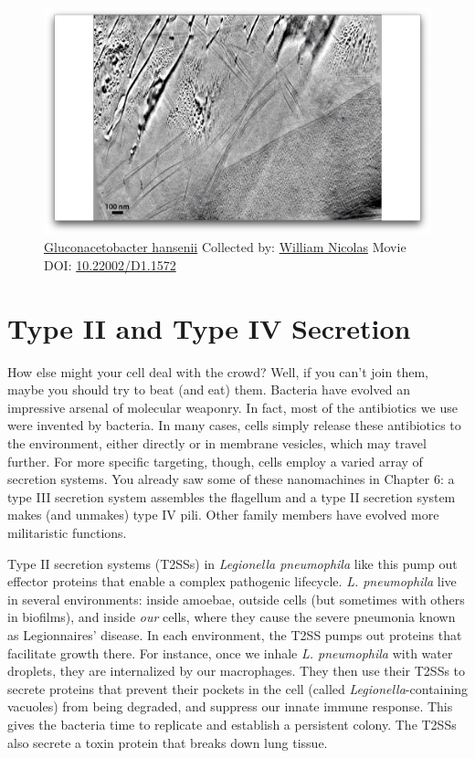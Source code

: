 \documentclass[]{tufte-book}
\begin{document}
\begin{figure}
\includegraphics{movie_stills/9_2} \caption[\protect\hyperlink{tree}{Gluconacetobacter hansenii} Collected
by: \protect\hyperlink{william_nicolas}{William Nicolas} Movie DOI:
\href{https://doi.org/10.22002/D1.1572}{10.22002/D1.1572}]{\protect\hyperlink{tree}{Gluconacetobacter hansenii} Collected
by: \protect\hyperlink{william_nicolas}{William Nicolas} Movie DOI:
\href{https://doi.org/10.22002/D1.1572}{10.22002/D1.1572}}\label{fig:9-2}
\end{figure}

\section{Type II and Type IV
Secretion}\label{type-ii-and-type-iv-secretion}

How else might your cell deal with the crowd? Well, if you can't join
them, maybe you should try to beat (and eat) them. Bacteria have evolved
an impressive arsenal of molecular weaponry. In fact, most of the
antibiotics we use were invented by bacteria. In many cases, cells
simply release these antibiotics to the environment, either directly or
in membrane vesicles, which may travel further. For more specific
targeting, though, cells employ a varied array of secretion systems. You
already saw some of these nanomachines in Chapter 6: a type III
secretion system assembles the flagellum and a type II secretion system
makes (and unmakes) type IV pili. Other family members have evolved more
militaristic functions.

Type II secretion systems (T2SSs) in \emph{Legionella pneumophila} like
this pump out effector proteins that enable a complex pathogenic
lifecycle. \emph{L. pneumophila} live in several environments: inside
amoebae, outside cells (but sometimes with others in biofilms), and
inside \emph{our} cells, where they cause the severe pneumonia known as
Legionnaires' disease. In each environment, the T2SS pumps out proteins
that facilitate growth there. For instance, once we inhale \emph{L.
pneumophila} with water droplets, they are internalized by our
macrophages. They then use their T2SSs to secrete proteins that prevent
their pockets in the cell (called \emph{Legionella}-containing vacuoles)
from being degraded, and suppress our innate immune response. This gives
the bacteria time to replicate and establish a persistent colony. The
T2SSs also secrete a toxin protein that breaks down lung tissue.
\end{document}
